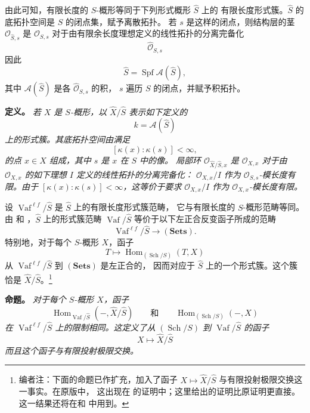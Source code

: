 由此可知，有限长度的 \(S\)-概形等同于下列形式概形 \(\widehat S\) 上的
有限长度形式簇。\(\widehat S\) 的底拓扑空间是 \(S\) 的闭点集，赋予离散拓扑。
若 \(s\) 是这样的闭点，则结构层的茎 \(\mathcal O_{\widehat S,s}\) 是
\(\mathcal O_{S,s}\) 对于由有限余长度理想定义的线性拓扑的分离完备化
\[
  \widehat{\mathcal O}_{S,s}
\]
因此
\[
  \widehat S
  =
  \operatorname{Spf}\mathcal A(\widehat S),
\]
其中 \(\mathcal A(\widehat S)\) 是各 \(\widehat{\mathcal O}_{S,s}\) 的积，
\(s\) 遍历 \(S\) 的闭点，并赋予积拓扑。

\medskip
\noindent\textbf{定义。}
\label{sga3:VIIB:1.2.6.definition}
\textit{若 \(X\) 是 \(S\)-概形，以 \(\widehat X/\widehat S\) 表示如下定义的
\[
  k=\mathcal A(\widehat S)
\]
上的形式簇。其底拓扑空间由满足
\[
  [\kappa(x):\kappa(s)]<\infty,
\]
的点 \(x\in X\) 组成，其中 \(s\) 是 \(x\) 在 \(S\) 中的像。
局部环 \(\mathcal O_{\widehat X/\widehat S,x}\) 是 \(\mathcal O_{X,x}\)
对于由 \(\mathcal O_{X,x}\) 的如下理想 \(I\) 定义的线性拓扑的分离完备化：
\(\mathcal O_{X,x}/I\) 作为 \(\mathcal O_{S,s}\)-模长度有限。由于
\([\kappa(x):\kappa(s)]<\infty\)，这等价于要求 \(\mathcal O_{X,x}/I\)
作为 \(\mathcal O_{X,x}\)-模长度有限。}

设 \(\operatorname{Vaf}^{\ell f}/\widehat S\) 是 \(\widehat S\) 上的有限长度形式簇范畴，
它与有限长度的 \(S\)-概形范畴等同。由  和
，\(\widehat S\) 上的形式簇范畴
\(\operatorname{Vaf}/\widehat S\) 等价于以下左正合反变函子所成的范畴
\[
  \operatorname{Vaf}^{\ell f}/\widehat S
  \longrightarrow
  (\mathbf{Sets}).
\]
特别地，对于每个 \(S\)-概形 \(X\)，函子
\[
  T\longmapsto
  \operatorname{Hom}_{(\operatorname{Sch}/S)}(T,X)
\]
从 \(\operatorname{Vaf}^{\ell f}/\widehat S\) 到 \((\mathbf{Sets})\) 是左正合的，
因而对应于 \(\widehat S\) 上的一个形式簇。这个簇恰是
\(\widehat X/\widehat S\)。\footnote{编者注：下面的命题已作扩充，加入了函子
\(X\mapsto\widehat X/\widehat S\) 与有限投射极限交换这一事实。在原版中，
这出现在  的证明中；这里给出的证明比原证明更直接。
这一结果还将在和
 中用到。}

\medskip
\noindent\textbf{命题。}
\label{sga3:VIIB:1.2.6.proposition}
\textit{对于每个 \(S\)-概形 \(X\)，函子}
\[
  \operatorname{Hom}_{\operatorname{Vaf}/\widehat S}
    (-,\widehat X/\widehat S)
  \qquad\textit{和}\qquad
  \operatorname{Hom}_{(\operatorname{Sch}/S)}(-,X)
\]
\textit{在 \(\operatorname{Vaf}^{\ell f}/\widehat S\) 上的限制相同。这定义了从
\((\operatorname{Sch}/S)\) 到 \(\operatorname{Vaf}/\widehat S\) 的函子}
\[
  X\longmapsto\widehat X/\widehat S
\]
\textit{而且这个函子与有限投射极限交换。}

